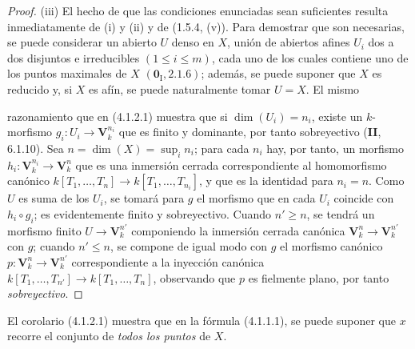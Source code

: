 \begin{proof}
(iii) El hecho de que las condiciones enunciadas sean suficientes resulta
inmediatamente de (i) y (ii) y de (1.5.4, (v)). Para demostrar que son
necesarias, se puede considerar un abierto $U$ denso en $X$, unión de abiertos
afines $U_i$ dos a dos disjuntos e irreducibles $(1\leqslant i\leqslant m)$,
cada uno de los cuales contiene uno de los puntos maximales de $X$
$(\mathbf{0}_{\mathrm I},2.1.6)$; además, se puede suponer que $X$ es reducido y, si
$X$ es afín, se puede naturalmente tomar $U=X$. El mismo


razonamiento que en (4.1.2.1) muestra que si $\dim(U_i)=n_i$, existe un
$k$-morfismo
$g_i:U_i\to\mathbf V_k^{n_i}$ que es finito y dominante, por tanto
sobreyectivo (\textbf{II}, 6.1.10). Sea $n=\dim(X)=\sup_i n_i$; para cada $n_i$ hay,
por tanto, un morfismo $h_i:\mathbf V_k^{n_i}\to\mathbf V_k^n$ que es una
inmersión cerrada correspondiente al homomorfismo canónico
$k[T_1,\ldots,T_n]\to k[T_1,\ldots,T_{n_i}]$, y que es la identidad para
$n_i=n$. Como $U$ es suma de los $U_i$, se tomará para $g$ el morfismo que en
cada $U_i$ coincide con $h_i\circ g_i$; es evidentemente finito y
sobreyectivo. Cuando $n'\geqslant n$, se tendrá un morfismo finito
$U\to\mathbf V_k^{n'}$ componiendo la inmersión cerrada canónica
$\mathbf V_k^n\to\mathbf V_k^{n'}$ con $g$; cuando $n'\leqslant n$, se compone
de igual modo con $g$ el morfismo canónico
$p:\mathbf V_k^n\to\mathbf V_k^{n'}$ correspondiente a la inyección canónica
$k[T_1,\ldots,T_{n'}]\to k[T_1,\ldots,T_n]$, observando que $p$ es fielmente
plano, por tanto \emph{sobreyectivo}.
\end{proof}

\begin{remark}[4.1.3]
\label{IV.2.4.1.3-fr}
El corolario (4.1.2.1) muestra que en la fórmula (4.1.1.1), se puede suponer
que $x$ recorre el conjunto de \emph{todos los puntos} de $X$.
\end{remark}
